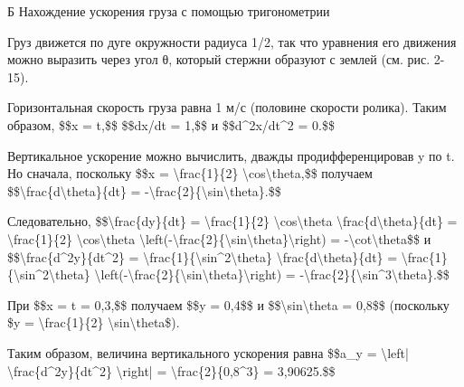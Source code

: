 \documentclass[10pt,oneside]{article}
\begin{document}
Б Нахождение ускорения груза с помощью тригонометрии\par

Груз движется по дуге окружности радиуса 1/2, так что уравнения его движения можно выразить через угол θ, который стержни образуют с землей (см. рис. 2-15).\par

Горизонтальная скорость груза равна 1 м/с (половине скорости ролика). Таким образом, \$\$x = t,\$\$ \$\$dx/dt = 1,\$\$ и \$\$d\textasciicircum{}2x/dt\textasciicircum{}2 = 0.\$\$\par

Вертикальное ускорение можно вычислить, дважды продифференцировав y по t. Но сначала, поскольку \$\$x = \textbackslash{}frac\{1\}\{2\} \textbackslash{}cos\textbackslash{}theta,\$\$ получаем \$\$\textbackslash{}frac\{d\textbackslash{}theta\}\{dt\} = -\textbackslash{}frac\{2\}\{\textbackslash{}sin\textbackslash{}theta\}.\$\$\par

Следовательно, \$\$\textbackslash{}frac\{dy\}\{dt\} = \textbackslash{}frac\{1\}\{2\} \textbackslash{}cos\textbackslash{}theta \textbackslash{}frac\{d\textbackslash{}theta\}\{dt\} = \textbackslash{}frac\{1\}\{2\} \textbackslash{}cos\textbackslash{}theta \textbackslash{}left(-\textbackslash{}frac\{2\}\{\textbackslash{}sin\textbackslash{}theta\}\textbackslash{}right) = -\textbackslash{}cot\textbackslash{}theta\$\$ и \$\$\textbackslash{}frac\{d\textasciicircum{}2y\}\{dt\textasciicircum{}2\} = \textbackslash{}frac\{1\}\{\textbackslash{}sin\textasciicircum{}2\textbackslash{}theta\} \textbackslash{}frac\{d\textbackslash{}theta\}\{dt\} = \textbackslash{}frac\{1\}\{\textbackslash{}sin\textasciicircum{}2\textbackslash{}theta\} \textbackslash{}left(-\textbackslash{}frac\{2\}\{\textbackslash{}sin\textbackslash{}theta\}\textbackslash{}right) = -\textbackslash{}frac\{2\}\{\textbackslash{}sin\textasciicircum{}3\textbackslash{}theta\}.\$\$\par

При \$\$x = t = 0,3,\$\$ получаем \$\$y = 0,4\$\$ и \$\$\textbackslash{}sin\textbackslash{}theta = 0,8\$\$ (поскольку \$y = \textbackslash{}frac\{1\}\{2\} \textbackslash{}sin\textbackslash{}theta\$).\par

Таким образом, величина вертикального ускорения равна \$\$a\_y = \textbackslash{}left| \textbackslash{}frac\{d\textasciicircum{}2y\}\{dt\textasciicircum{}2\} \textbackslash{}right| = \textbackslash{}frac\{2\}\{0,8\textasciicircum{}3\} = 3,90625.\$\$\par
\end{document}
